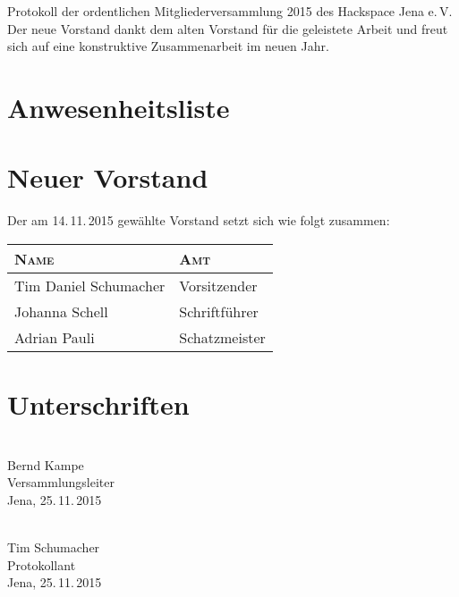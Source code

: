 \documentclass[ngerman]{scrartcl}
\begin{document}
\begin{Protokoll}{Protokoll der ordentlichen Mitgliederversammlung 2015 des Hackspace Jena e.\,V.}
Der neue Vorstand dankt dem alten Vorstand für die geleistete Arbeit und freut
sich auf eine konstruktive Zusammenarbeit im neuen Jahr.

\newpage
\appendix

\section{Anwesenheitsliste}
\newpage
\section{Neuer Vorstand}

Der am 14.\,11.\,2015 gewählte Vorstand setzt sich wie folgt zusammen:

\label{sec:neuer_vorstand}
\begin{table}[h!]
    \centering
    \begin{tabularx}{\textwidth}{l|l}
        \textsc{Name} & \textsc{Amt} \\ \hline
        Tim Daniel Schumacher & Vorsitzender \\
        Johanna Schell &  Schriftführer \\
        Adrian Pauli & Schatzmeister
    \end{tabularx}
\end{table}

\newpage
\section{Unterschriften}
\vspace{2cm}
\begin{multicols}{2}
  \noindent \makebox[5cm]{\hrulefill} \\
  Bernd Kampe \\
  Versammlungsleiter \\
  Jena, 25.\,11.\,2015

  \noindent \makebox[5cm]{\hrulefill} \\
  Tim Schumacher \\
  Protokollant \\
  Jena, 25.\,11.\,2015
\end{multicols}

\end{Protokoll}
\end{document}
